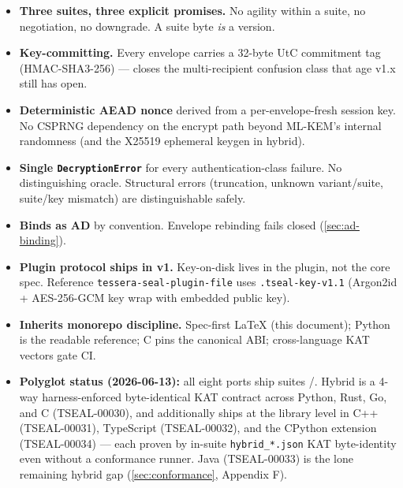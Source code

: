 \begin{calloutinfo}[At a glance]
\begin{itemize}
\item \textbf{Three suites, three explicit promises.} No agility within a suite, no negotiation, no downgrade. A suite byte \emph{is} a version.
\item \textbf{Key-committing.} Every envelope carries a 32-byte UtC commitment tag (HMAC-SHA3-256) --- closes the multi-recipient confusion class that age v1.x still has open.
\item \textbf{Deterministic AEAD nonce} derived from a per-envelope-fresh session key. No CSPRNG dependency on the encrypt path beyond ML-KEM's internal  randomness (and the X25519 ephemeral keygen in hybrid).
\item \textbf{Single \texttt{DecryptionError}} for every authentication-class failure. No distinguishing oracle. Structural errors (truncation, unknown variant/suite, suite/key mismatch) are distinguishable safely.
\item \textbf{Binds \pqid{} as AD} by convention. Envelope rebinding fails closed (\cref{sec:ad-binding}).
\item \textbf{Plugin protocol ships in v1.} Key-on-disk lives in the plugin, not the core spec. Reference \texttt{tessera-seal-plugin-file} uses \texttt{.tseal-key-v1.1} (Argon2id \citep{rfc9106} + AES-256-GCM key wrap with embedded public key).
\item \textbf{Inherits monorepo discipline.} Spec-first LaTeX (this document); Python is the readable reference; C pins the canonical ABI; cross-language KAT vectors gate CI.
\item \textbf{Polyglot status (2026-06-13):} all eight ports ship suites /. Hybrid  is a 4-way harness-enforced byte-identical KAT contract across Python, Rust, Go, and C (TSEAL-00030), and additionally ships at the library level in C++ (TSEAL-00031), TypeScript (TSEAL-00032), and the CPython extension (TSEAL-00034) --- each proven by in-suite \texttt{hybrid\_*.json} KAT byte-identity even without a \pqcrypt{} conformance runner. Java (TSEAL-00033) is the lone remaining hybrid gap (\cref{sec:conformance}, Appendix F).
\end{itemize}
\end{calloutinfo}

